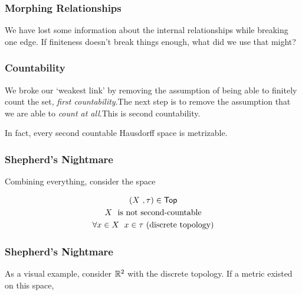 \begin{frame}
    \frametitle{Morphing Relationships}
    \centering

    \pause

    \begin{center}
        We have lost some information about the internal relationships while
        breaking one edge. \pause If finiteness doesn't break things enough,
        what did we use that might?
    \end{center}

\end{frame}

\begin{frame}
    \frametitle{Countability}

    We broke our `weakest link' by removing the assumption of being able to
    finitely count the set, \emph{first countability}.\pause The next step is to
    remove the assumption that we are able to \emph{count at all}.\pause This is
    second countability.

    \pause

    In fact, every second countable Hausdorff space is metrizable.

\end{frame}

\begin{frame}
    \frametitle{Shepherd's Nightmare}

    Combining everything, consider the space

    \begin{gather*}
        (X~, \tau) \in \textsf{Top}\\
        X~ \textnormal{ is not second-countable}\\
        \forall x \in X~ \; x \in \tau \textnormal{ (discrete topology)}
    \end{gather*}

\end{frame}

\begin{frame}
    \frametitle{Shepherd's Nightmare}

    As a visual example, consider \(\mathbb{R}^2\) with the discrete topology.
    \pause If a metric existed on this space, 

\end{frame}